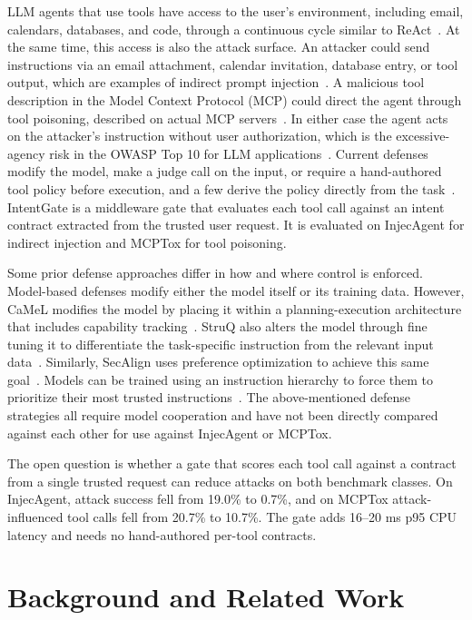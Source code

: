 \documentclass[a4paper,conference]{IEEEtran}
\begin{document}
LLM agents that use tools have access to the user's environment, including email, calendars, databases, and code, through a continuous cycle similar to ReAct~\cite{yao2023react}. At the same time, this access is also the attack surface. An attacker could send instructions via an email attachment, calendar invitation, database entry, or tool output, which are examples of indirect prompt injection~\cite{greshake2023notwhat,perez2022ignore}. A malicious tool description in the Model Context Protocol (MCP) could direct the agent through tool poisoning, described on actual MCP servers~\cite{wang2026mcptox,radosevich2025mcp}. In either case the agent acts on the attacker's instruction without user authorization, which is the excessive-agency risk in the OWASP Top 10 for LLM applications~\cite{owasp2025llmtop10}. Current defenses modify the model, make a judge call on the input, or require a hand-authored tool policy before execution, and a few derive the policy directly from the task~\cite{shi2025progent}. IntentGate is a middleware gate that evaluates each tool call against an intent contract extracted from the trusted user request. It is evaluated on InjecAgent for indirect injection and MCPTox for tool poisoning.

Some prior defense approaches differ in how and where control is enforced. Model-based defenses modify either the model itself or its training data. However, CaMeL modifies the model by placing it within a planning-execution architecture that includes capability tracking~\cite{debenedetti2025camel}. StruQ also alters the model through fine tuning it to differentiate the task-specific instruction from the relevant input data~\cite{chen2025struq}. Similarly, SecAlign uses preference optimization to achieve this same goal~\cite{chen2025secalign}. Models can be trained using an instruction hierarchy to force them to prioritize their most trusted instructions~\cite{wallace2024instruction}. The above-mentioned defense strategies all require model cooperation and have not been directly compared against each other for use against InjecAgent or MCPTox.

The open question is whether a gate that scores each tool call against a contract from a single trusted request can reduce attacks on both benchmark classes. On InjecAgent, attack success fell from 19.0\% to 0.7\%, and on MCPTox attack-influenced tool calls fell from 20.7\% to 10.7\%. The gate adds 16--20 ms p95 CPU latency and needs no hand-authored per-tool contracts.

\section{Background and Related Work}
\end{document}
